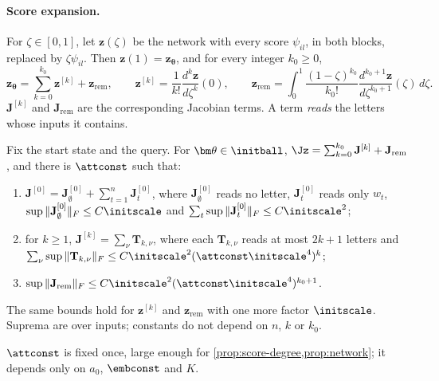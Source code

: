 \paragraph{Score expansion.} For $\zeta\in[0,1]$, let $\bm z(\zeta)$ be the network with every score $\psi_{il}$, in both blocks, replaced by
$\zeta\psi_{il}$. Then $\bm z(1)=\bm z_{\bm\theta}$, and for every integer $k_0\ge0$,
\begin{equation}
 \bm z_{\bm\theta}=\sum_{k=0}^{k_0}\bm z^{[k]}+\bm z_{\mathrm{rem}},\qquad
 \bm z^{[k]}=\frac{1}{k!}\frac{d^k\bm z}{d\zeta^k}(0),\qquad
 \bm z_{\mathrm{rem}}=\int_0^1\frac{(1-\zeta)^{k_0}}{k_0!}\frac{d^{k_0+1}\bm z}{d\zeta^{k_0+1}}(\zeta)\,d\zeta .
 \label{eq:score-split}
\end{equation}
$\mathbf J^{[k]}$ and $\mathbf J_{\mathrm{rem}}$ are the corresponding Jacobian terms. A term \emph{reads} the letters whose inputs it contains.

\begin{proposition}
\label{prop:score-degree}
Fix the start state and the query. For $\bm\theta\in\initball$, $\Jz=\sum_{k=0}^{k_0}\mathbf J^{[k]}+\mathbf J_{\mathrm{rem}}$, and there is $\attconst$ such that:
\begin{enumerate}[label=(\roman*),leftmargin=*,itemsep=2pt,topsep=2pt]
\item $\mathbf J^{[0]}=\mathbf J^{[0]}_\emptyset+\sum_{t=1}^n\mathbf J^{[0]}_t$, where $\mathbf J^{[0]}_\emptyset$ reads no letter, $\mathbf J^{[0]}_t$ reads only $w_t$, $\sup\|\mathbf J^{[0]}_\emptyset\|_F\le C\initscale$ and
$\sum_t\sup\|\mathbf J^{[0]}_t\|_F\le C\initscale^2$;
\item for $k\ge1$, $\mathbf J^{[k]}=\sum_\nu\mathbf T_{k,\nu}$, where each $\mathbf T_{k,\nu}$ reads at most $2k+1$ letters and $\sum_\nu\sup\|\mathbf T_{k,\nu}\|_F\le C\initscale^2(\attconst\initscale^4)^k$;
\item $\sup\|\mathbf J_{\mathrm{rem}}\|_F\le C\initscale^2(\attconst\initscale^4)^{k_0+1}$.
\end{enumerate}
The same bounds hold for $\bm z^{[k]}$ and $\bm z_{\mathrm{rem}}$ with one more factor $\initscale$. Suprema are over inputs; constants do not depend on
$n$, $k$ or $k_0$.
\end{proposition}

$\attconst$ is fixed once, large enough for \cref{prop:score-degree,prop:network}; it depends only on $a_0$, $\embconst$ and $K$.

\label{app:network}

